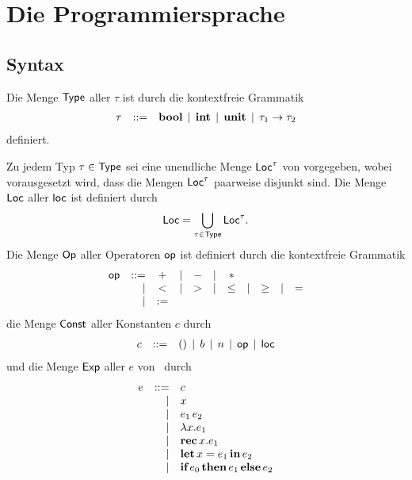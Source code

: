 \documentclass[12pt,a4paper,bigheadings]{scrartcl}
\begin{document}

\section{Die Programmiersprache}

\subsection{Syntax}

\begin{definition} \label{definition:Typen_der_Programmiersprache}
  Die Menge ${\textup{\textsf{Type\/}}}$ aller  $\tau$ ist durch die kontextfreie Grammatik
  \[\begin{array}{rrlll}
  \tau & ::= & \normalfont\textbf{bool} \,\mid\, \normalfont\textbf{int} \,\mid\, \normalfont\textbf{unit} \,\mid\, \tau_1\to\tau_2
  \end{array}\]
  definiert.
\end{definition}

\begin{definition} \label{definition:Abstrakte_Syntax_der_Programmiersprache}
  Zu jedem Typ $\tau\in{\textup{\textsf{Type\/}}}$ sei eine unendliche Menge ${\textup{\textsf{Loc\/}}}^\tau$ von
  vorgegeben, wobei vorausgesetzt wird, dass die Mengen ${\textup{\textsf{Loc\/}}}^\tau$ paarweise disjunkt
  sind. Die Menge ${\textup{\textsf{Loc\/}}}$ aller  ${\textup{\textsf{loc\/}}}$ ist definiert durch
  \[
    {\textup{\textsf{Loc\/}}} = \bigcup_{\tau\in{\textup{\textsf{Type\/}}}} {\textup{\textsf{Loc\/}}}^\tau.
  \]
  Die Menge ${\textup{\textsf{Op\/}}}$ aller Operatoren ${\textup{\textsf{op\/}}}$ ist definiert durch die kontextfreie Grammatik
  \[\begin{array}{rrcccccccccl}
  {\textup{\textsf{op\/}}} & ::= & + & \mid & - & \mid &  *  &      &     &      &
      \\ & \mid & < & \mid & > & \mid & \le & \mid & \ge & \mid & =
      \\ & \mid & :=
  \end{array}\]
  die Menge ${\textup{\textsf{Const\/}}}$ aller Konstanten $c$ durch
  \[\begin{array}{rrlll}
  c & ::= & () \,\mid\, b \,\mid\, n \,\mid\, {\textup{\textsf{op\/}}} \,\mid\, {\textup{\textsf{loc\/}}}
  \end{array}\]
  und die Menge ${\textup{\textsf{Exp\/}}}$ aller  $e$ von \Lf\ durch
  \[\begin{array}{rrlll}
  e & ::= & c
    \\ & \mid & x
    \\ & \mid & e_1\,e_2
    \\ & \mid & \lambda x.e_1
    \\ & \mid & \normalfont\textbf{rec}\,x.e_1
    \\ & \mid & \normalfont\textbf{let}\,x=e_1\,\normalfont\textbf{in}\,e_2
    \\ & \mid & \normalfont\textbf{if}\,e_0\,\normalfont\textbf{then}\,e_1\,\normalfont\textbf{else}\,e_2
  \end{array}\]
\end{definition}
\end{document}
